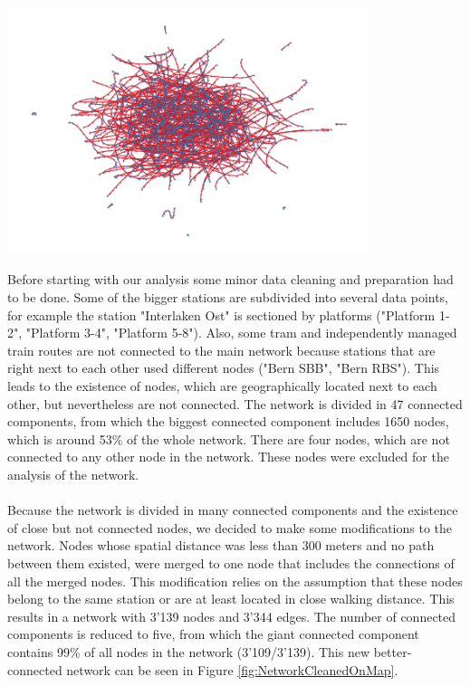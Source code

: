 \documentclass{Resources/netsci-project}
\begin{document}
\begin{center}
    \centering
    \includegraphics[width=300pt]{Resources/Network_no_map}
    \label{fig:NetworkNoMap}
\end{center}
\noindent
Before starting with our analysis some minor data cleaning and preparation had to be done. Some of the bigger stations are subdivided into several data points, for example the station "Interlaken Ost" is sectioned by platforms ("Platform 1-2", "Platform 3-4", "Platform 5-8"). Also, some tram and independently managed train routes are not connected to the main network because stations that are right next to each other used different nodes ("Bern SBB", "Bern RBS"). This leads to the existence of nodes, which are geographically located next to each other, but nevertheless are not connected. The network is divided in 47 connected components, from which the biggest connected component includes 1650 nodes, which is around 53\% of the whole network. There are four nodes, which are not connected to any other node in the network. These nodes were excluded for the analysis of the network.
\\~\\
Because the network is divided in many connected components and the existence of close but not connected nodes, we decided to make some modifications to the network. Nodes whose spatial distance was less than 300 meters and no path between them existed, were merged to one node that includes the connections of all the merged nodes. This modification relies on the assumption that these nodes belong to the same station or are at least located in close walking distance. This results in a network with 3'139 nodes and 3'344 edges. The number of connected components is reduced to five, from which the giant connected component contains 99\% of all nodes in the network (3’109/3’139). This new better-connected network can be seen in Figure \ref{fig:NetworkCleanedOnMap}.
\end{document}
